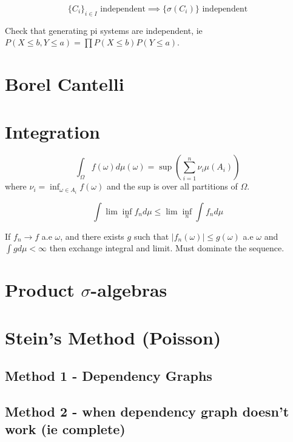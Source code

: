 \documentclass{article}
\begin{document}
\begin{theorem}
$$\{C_i\}_{i\in I} \text { independent} \implies \{\sigma(C_i)\} \text{ independent} $$
\begin{example}
Check that generating pi systems are independent, ie $P(X\leq b, Y\leq a) = \prod P(X\leq b) P(Y\leq a)$. 
\end{example}

\end{theorem}

\section{Borel Cantelli} 
\section{Integration}
\begin{definition}
$$\int_\Omega f(\omega) d\mu(\omega) = \sup \left (\sum_{i=1}^n \nu_i \mu(A_i)\right)$$
where $\nu_i = \inf_{\omega \in A_i} f(\omega)$ and the sup is over all partitions of $\Omega$.
\end{definition}
\begin{theorem}
$$\int \lim \inf_n f_n d\mu \leq \lim \inf_n \int f_n d\mu $$
\end{theorem}
\begin{theorem}[DCT]
If $f_n \to f$ a.e $\omega$, and there exists $g$ such that $|f_n(\omega)|\leq g(\omega)$ a.e $\omega$ and $\int gd\mu <\infty$ then exchange integral and limit. Must dominate the sequence. 
\end{theorem}

\section{Product $\sigma$-algebras}

\section{Stein's Method (Poisson)}


\subsection{Method 1 - Dependency Graphs}

\subsection{Method 2 - when dependency graph doesn't work (ie complete)}
\end{document}

